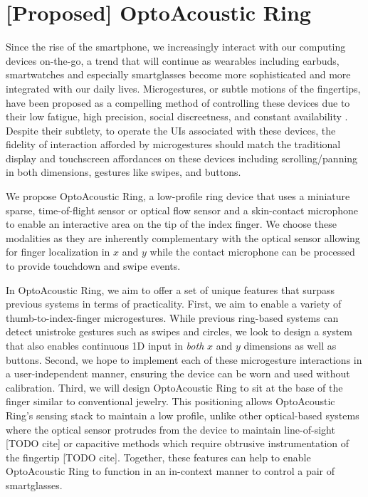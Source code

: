 \documentclass [11pt, proquest] {uwthesis}[2020/02/24]
\begin{document}
\chapter{[Proposed] OptoAcoustic Ring}

Since the rise of the smartphone, we increasingly interact with our computing devices on-the-go, a trend that will continue as wearables including earbuds, smartwatches and especially smartglasses become more sophisticated and more integrated with our daily lives. Microgestures, or subtle motions of the fingertips, have been proposed as a compelling method of controlling these devices due to their low fatigue, high precision, social discreetness, and constant availability \cite{ashbrook2010enabling}.
Despite their subtlety, to operate the UIs associated with these devices, the fidelity of interaction afforded by microgestures should match the traditional display and touchscreen affordances on these devices including scrolling/panning in both dimensions, gestures like swipes, and buttons.

We propose OptoAcoustic Ring, a low-profile ring device that uses a miniature sparse, time-of-flight sensor or optical flow sensor and a skin-contact microphone to enable an interactive area on the tip of the index finger. We choose these modalities as they are inherently complementary with the optical sensor allowing for finger localization in $x$ and $y$ while the contact microphone can be processed to provide touchdown and swipe events.  

In OptoAcoustic Ring, we aim to offer a set of unique features that surpass previous systems in terms of practicality. 
First, we aim to enable a variety of  thumb-to-index-finger microgestures. While previous ring-based systems can detect unistroke gestures such as swipes and circles, we look to design a system that also enables continuous 1D input in \textit{both} $x$ and $y$ dimensions as well as buttons.
Second, we hope to implement each of these microgesture interactions in a user-independent manner, ensuring the device can be worn and used without calibration.
Third, we will design OptoAcoustic Ring to sit at the base of the finger similar to conventional jewelry. This positioning allows OptoAcoustic Ring's sensing stack to maintain a low profile, unlike other optical-based systems where the optical sensor protrudes from the device to maintain line-of-sight  [TODO cite] or capacitive methods which require obtrusive instrumentation of the fingertip [TODO cite].
Together, these features can help to enable OptoAcoustic Ring to function in an in-context manner to control a pair of smartglasses.
\end{document}
